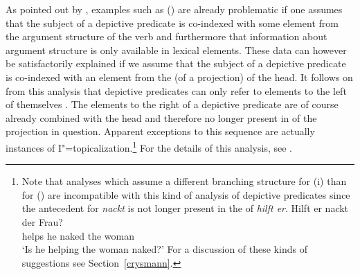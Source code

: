 As pointed out by \citet[--88]{Kaufmann95a}, examples such as () are already problematic if one assumes that
the subject of a depictive predicate is co-indexed with some element from the argument structure of the verb and furthermore
that information about argument structure is only available in lexical elements. These data can however be satisfactorily 
explained if we assume that the subject of a depictive predicate is co-indexed with an element from the \subcatl (of a projection)
of the head. It follows on from this analysis that depictive predicates can only refer to elements to the left of themselves
\citep[Chapter~4.1.4.1]{Mueller2002b}. The elements to the right of a depictive predicate are of course already combined with
the head and therefore no longer present in \subcatl of the projection in question.
Apparent exceptions to this sequence are actually instances of I"=topicalization.\footnote{
		Note that analyses which assume a different branching structure for (i) than for () are
		incompatible with this kind of analysis of depictive predicates since the antecedent for
		\emph{nackt} is not longer present in the \subcatl of \emph{hilft er}.
		\ea
		\gll Hilft er nackt der Frau?\\
		     helps he naked the woman\\
		\glt `Is he helping the woman naked?'
		\z
		For a discussion of these kinds of suggestions see Section~\ref{crysmann}.%
}
For the details of this analysis, see .

